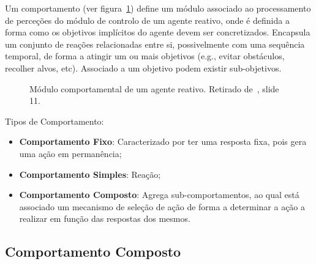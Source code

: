 Um comportamento (ver figura~\ref{fig:agente-reativo-comportamento}) define um módulo associado ao processamento de perceções do módulo de controlo de um agente reativo, onde é definida a forma como os objetivos implícitos do agente devem ser concretizados. Encapsula um conjunto de reações relacionadas entre si, possivelmente com uma sequência temporal, de forma a atingir um ou mais objetivos (e.g., evitar obstáculos, recolher alvos, etc). Associado a um objetivo podem existir sub-objetivos.

\begin{figure}[H]
    \begin{center}
    \end{center}
    \caption{Módulo comportamental de um agente reativo.
    Retirado de~\cite{isel:iasa:slides:arq-agentes-reativos-parte-1}, slide 11.}\label{fig:agente-reativo-comportamento}
\end{figure}

Tipos de Comportamento:

\begin{itemize}
    \item \textbf{Comportamento Fixo}: Caracterizado por ter uma resposta fixa, pois gera uma ação em permanência;
    \item \textbf{Comportamento Simples}: Reação;
    \item \textbf{Comportamento Composto}: Agrega sub-comportamentos, ao qual está associado um mecanismo de seleção de ação de forma a determinar a ação a realizar em função das respostas dos mesmos.
\end{itemize}

\subsection{Comportamento Composto}\label{subsec:comportamento-composto}

